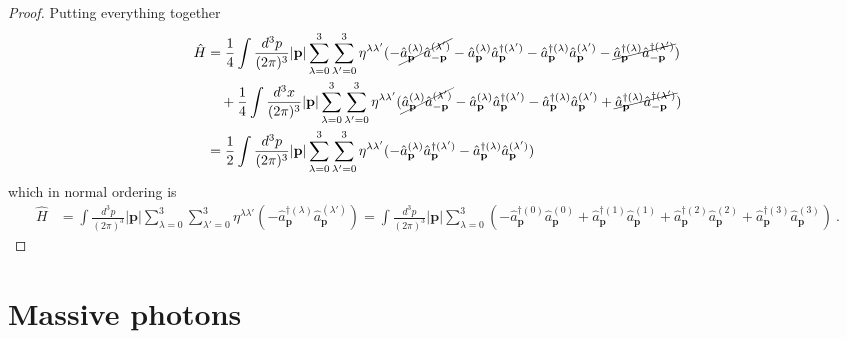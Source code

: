 \begin{proof}
        Putting everything together 
        \begin{equation*}
        \begin{aligned}
            \hat H & = \frac{1}{4} \int \frac{d^3 p}{(2\pi)^3} |\mathbf p| \sum_{\lambda=0}^{3} \sum_{\lambda'=0}^{3} \eta^{\lambda \lambda'} (- \cancel{\hat a_{\mathbf p}^{(\lambda)} \hat a_{- \mathbf p}^{(\lambda')}} - \hat a_{\mathbf p}^{(\lambda)} \hat a_{\mathbf p}^{\dagger (\lambda')} - \hat a_{\mathbf p}^{\dagger (\lambda)} \hat a_{\mathbf p}^{(\lambda')} - \cancel{\hat a_{\mathbf p}^{\dagger (\lambda)} \hat a_{-\mathbf p}^{\dagger (\lambda')}} ) \\ & \quad + \frac{1}{4} \int \frac{d^3 x}{(2\pi)^3} |\mathbf p| \sum_{\lambda=0}^{3} \sum_{\lambda'=0}^{3} \eta^{\lambda \lambda'} ( \cancel{\hat a_{\mathbf p}^{(\lambda)} \hat a_{- \mathbf p}^{(\lambda')}}  - \hat a_{\mathbf p}^{(\lambda)} \hat a_{\mathbf p}^{\dagger (\lambda')}  - \hat a_{\mathbf p}^{\dagger (\lambda)} \hat a_{\mathbf p}^{(\lambda')} + \cancel{\hat a_{\mathbf p}^{\dagger (\lambda)} \hat a_{- \mathbf p}^{\dagger (\lambda')}} ) \\ & = \frac{1}{2} \int \frac{d^3 p}{(2\pi)^3} |\mathbf p| \sum_{\lambda=0}^{3} \sum_{\lambda'=0}^{3} \eta^{\lambda \lambda'} (- \hat a_{\mathbf p}^{(\lambda)} \hat a_{\mathbf p}^{\dagger (\lambda')} - \hat a_{\mathbf p}^{\dagger (\lambda)} \hat a_{\mathbf p}^{(\lambda')})
        \end{aligned}
        \end{equation*}
        which in normal ordering is 
        \begin{equation*}
        \begin{aligned}
            \hat H & = \int \frac{d^3 p}{(2\pi)^3} |\mathbf p| \sum_{\lambda=0}^{3} \sum_{\lambda'=0}^{3} \eta^{\lambda \lambda'} (- \hat a_{\mathbf p}^{\dagger (\lambda)} \hat a_{\mathbf p}^{(\lambda')}) = \int \frac{d^3 p}{(2\pi)^3} |\mathbf p| \sum_{\lambda=0}^{3} (- \hat a_{\mathbf p}^{\dagger (0)} \hat a_{\mathbf p}^{(0)} + \hat a_{\mathbf p}^{\dagger (1)} \hat a_{\mathbf p}^{(1)} + \hat a_{\mathbf p}^{\dagger (2)} \hat a_{\mathbf p}^{(2)}+ \hat a_{\mathbf p}^{\dagger (3)} \hat a_{\mathbf p}^{(3)}) ~.
        \end{aligned}
        \end{equation*}
    \end{proof}

\chapter{Massive photons}    

